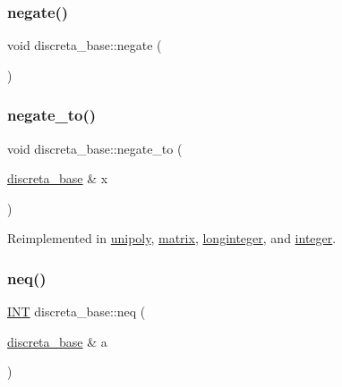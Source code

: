 \mbox{\label{classdiscreta__base_aac1be1125008f8a93a3083cd1a43878d}} 
\subsubsection{\texorpdfstring{negate()}{negate()}}
{\footnotesize\ttfamily void discreta\+\_\+base\+::negate (\begin{DoxyParamCaption}{ }\end{DoxyParamCaption})}

\mbox{\label{classdiscreta__base_a65ad2034f2f4518d424b814974018a03}} 
\subsubsection{\texorpdfstring{negate\+\_\+to()}{negate\_to()}}
{\footnotesize\ttfamily void discreta\+\_\+base\+::negate\+\_\+to (\begin{DoxyParamCaption}\item[{\mbox{\hyperlink{classdiscreta__base}{discreta\+\_\+base}} \&}]{x }\end{DoxyParamCaption})\hspace{0.3cm}{\ttfamily [virtual]}}



Reimplemented in \mbox{\hyperlink{classunipoly_a2181196b44786790f58b72510620db97}{unipoly}}, \mbox{\hyperlink{classmatrix_acb93b95943eee2253b7b3b799333a24c}{matrix}}, \mbox{\hyperlink{classlonginteger_a1de6a5663bb80562dee0e6ca1a808ff1}{longinteger}}, and \mbox{\hyperlink{classinteger_a1da2bd683bdef336057ef2b84d4b3978}{integer}}.

\mbox{\label{classdiscreta__base_a42975aaa9bb0b76d468df7fdb9390251}} 
\subsubsection{\texorpdfstring{neq()}{neq()}}
{\footnotesize\ttfamily \mbox{\hyperlink{galois_8h_a09fddde158a3a20bd2dcadb609de11dc}{I\+NT}} discreta\+\_\+base\+::neq (\begin{DoxyParamCaption}\item[{\mbox{\hyperlink{classdiscreta__base}{discreta\+\_\+base}} \&}]{a }\end{DoxyParamCaption})}

